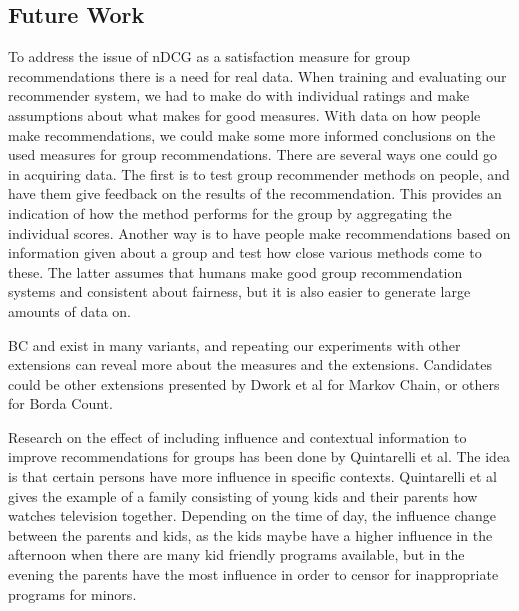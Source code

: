 \subsection{Future Work}\label{sec:futurework}

To address the issue of nDCG as a satisfaction measure for group recommendations there is a need for real data. When training and evaluating our recommender system, we had to make do with individual ratings and make assumptions about what makes for good measures. With data on how people make recommendations, we could make some more informed conclusions on the used measures for group recommendations. There are several ways one could go in acquiring data. The first is to test group recommender methods on people, and have them give feedback on the results of the recommendation. This provides an indication of how the method performs for the group by aggregating the individual scores. Another way is to have people make recommendations based on information given about a group and test how close various methods come to these. The latter assumes that humans make good group recommendation systems and consistent about fairness, but it is also easier to generate large amounts of data on.

BC and \MC exist in many variants, and repeating our experiments with other extensions can reveal more about the measures and the extensions. Candidates could be other extensions presented by Dwork et al\cite{rank:aggregation} for Markov Chain, or others for Borda Count.


Research on the effect of including influence and contextual information to improve recommendations for groups has been done by Quintarelli et al\cite{Quintarelli2016}. The idea is that certain persons have more influence in specific contexts. Quintarelli et al gives the example of a family consisting of young kids and their parents how watches television together. Depending on the time of day, the influence change between the parents and kids, as the kids maybe have a higher influence in the afternoon when there are many kid friendly programs available, but in the evening the parents have the most influence in order to censor for inappropriate programs for minors. 

